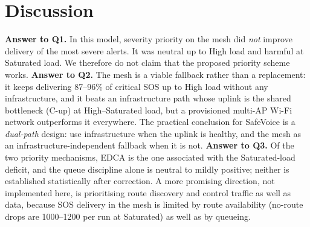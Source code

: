 \section{Discussion}
\textbf{Answer to Q1.} In this model, severity priority on the mesh did \emph{not} improve delivery of the most severe alerts. It was neutral up to High load and harmful at Saturated load. We therefore do not claim that the proposed priority scheme works.
\textbf{Answer to Q2.} The mesh is a viable fallback rather than a replacement: it keeps delivering 87--96\% of critical SOS up to High load without any infrastructure, and it beats an infrastructure path whose uplink is the shared bottleneck
(C-up) at High--Saturated load, but a provisioned multi-AP Wi-Fi network outperforms it everywhere. The practical conclusion for SafeVoice is a \emph{dual-path} design: use infrastructure when the uplink is healthy,
and the mesh as an infrastructure-independent fallback when it is not.
\textbf{Answer to Q3.} Of the two priority mechanisms, EDCA is the one associated with the Saturated-load deficit, and the queue discipline alone is neutral to mildly positive; neither is established statistically after correction.
A more promising direction, not implemented here, is prioritising route discovery and control traffic as well as data, because SOS delivery in the mesh is limited by route availability (no-route drops are 1000--1200 per run at Saturated) as well as by queueing.

